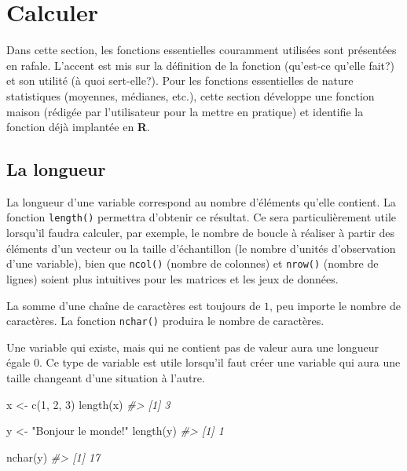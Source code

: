 \documentclass[
]{book}
\newenvironment{Shaded}{}{}
\newcommand{\CommentTok}[1]{\textit{#1}}
\newcommand{\DecValTok}[1]{#1}
\newcommand{\FunctionTok}[1]{#1}
\newcommand{\NormalTok}[1]{#1}
\newcommand{\OtherTok}[1]{#1}
\newcommand{\StringTok}[1]{#1}
\begin{document}
\hypertarget{calculer}{%
\chapter{Calculer}\label{calculer}}

Dans cette section, les fonctions essentielles couramment utilisées sont présentées en rafale. L'accent est mis sur la définition de la fonction (qu'est-ce qu'elle fait?) et son utilité (à quoi sert-elle?). Pour les fonctions essentielles de nature statistiques (moyennes, médianes, etc.), cette section développe une fonction maison (rédigée par l'utilisateur pour la mettre en pratique) et identifie la fonction déjà implantée en \textbf{R}.

\hypertarget{la-longueur}{%
\section{La longueur}\label{la-longueur}}

La longueur d'une variable correspond au nombre d'éléments qu'elle contient. La fonction \texttt{length()} permettra d'obtenir ce résultat. Ce sera particulièrement utile lorsqu'il faudra calculer, par exemple, le nombre de boucle à réaliser à partir des éléments d'un vecteur ou la taille d'échantillon (le nombre d'unités d'observation d'une variable), bien que \texttt{ncol()} (nombre de colonnes) et \texttt{nrow()} (nombre de lignes) soient plus intuitives pour les matrices et les jeux de données.

La somme d'une chaîne de caractères est toujours de \(1\), peu importe le nombre de caractères. La fonction \texttt{nchar()} produira le nombre de caractères.

Une variable qui existe, mais qui ne contient pas de valeur aura une longueur égale \(0\). Ce type de variable est utile lorsqu'il faut créer une variable qui aura une taille changeant d'une situation à l'autre.

\begin{Shaded}
\begin{Highlighting}[]
\NormalTok{x }\OtherTok{\textless{}{-}} \FunctionTok{c}\NormalTok{(}\DecValTok{1}\NormalTok{, }\DecValTok{2}\NormalTok{, }\DecValTok{3}\NormalTok{)}
\FunctionTok{length}\NormalTok{(x)}
\CommentTok{\#\textgreater{} [1] 3}

\NormalTok{y }\OtherTok{\textless{}{-}} \StringTok{"Bonjour le monde!"}
\FunctionTok{length}\NormalTok{(y)}
\CommentTok{\#\textgreater{} [1] 1}

\FunctionTok{nchar}\NormalTok{(y)}
\CommentTok{\#\textgreater{} [1] 17}
\end{Highlighting}
\end{Shaded}
\end{document}
